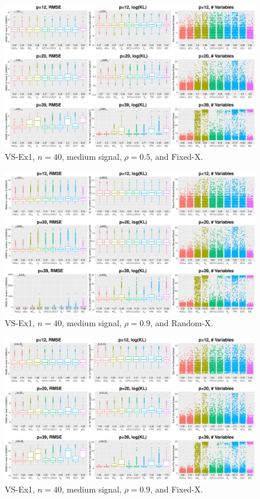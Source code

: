 \begin{figure}[!ht]
\centering
\includegraphics[width=\textwidth]{figures/supplement/fixedx_VS-Ex1_n40_msnr_rho05.eps}
\caption{VS-Ex1, $n=40$, medium signal, $\rho=0.5$, and Fixed-X.}
\end{figure}
\clearpage
\begin{figure}[!ht]
\centering
\includegraphics[width=\textwidth]{figures/supplement/randomx_VS-Ex1_n40_msnr_rho09.eps}
\caption{VS-Ex1, $n=40$, medium signal, $\rho=0.9$, and Random-X.}
\end{figure}
\begin{figure}[!ht]
\centering
\includegraphics[width=\textwidth]{figures/supplement/fixedx_VS-Ex1_n40_msnr_rho09.eps}
\caption{VS-Ex1, $n=40$, medium signal, $\rho=0.9$, and Fixed-X.}
\end{figure}
